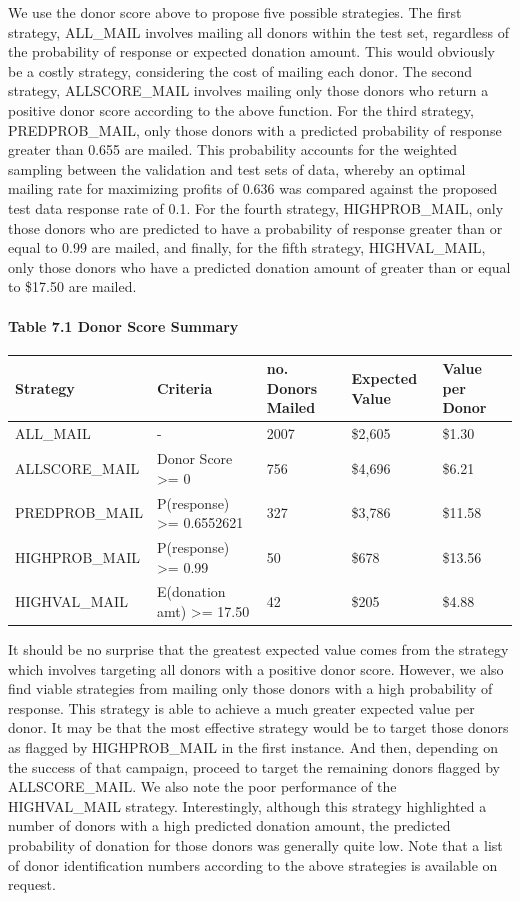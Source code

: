 \documentclass[]{article}
\let\oldparagraph\paragraph
\renewcommand{\paragraph}[1]{\oldparagraph{#1}\mbox{}}
\begin{document}
We use the donor score above to propose five possible strategies. The
first strategy, ALL\_MAIL involves mailing all donors within the test
set, regardless of the probability of response or expected donation
amount. This would obviously be a costly strategy, considering the cost
of mailing each donor. The second strategy, ALLSCORE\_MAIL involves
mailing only those donors who return a positive donor score according to
the above function. For the third strategy, PREDPROB\_MAIL, only those
donors with a predicted probability of response greater than 0.655 are
mailed. This probability accounts for the weighted sampling between the
validation and test sets of data, whereby an optimal mailing rate for
maximizing profits of 0.636 was compared against the proposed test data
response rate of 0.1. For the fourth strategy, HIGHPROB\_MAIL, only
those donors who are predicted to have a probability of response greater
than or equal to 0.99 are mailed, and finally, for the fifth strategy,
HIGHVAL\_MAIL, only those donors who have a predicted donation amount of
greater than or equal to \$17.50 are mailed.

\paragraph{Table 7.1 Donor Score
Summary}\label{table-7.1-donor-score-summary}

\begin{longtable}[]{@{}lllll@{}}
\toprule
Strategy & Criteria & no. Donors Mailed & Expected Value & Value per
Donor\tabularnewline
\midrule
\endhead
ALL\_MAIL & - & 2007 & \$2,605 & \$1.30\tabularnewline
ALLSCORE\_MAIL & Donor Score \textgreater{}= 0 & 756 & \$4,696 &
\$6.21\tabularnewline
PREDPROB\_MAIL & P(response) \textgreater{}= 0.6552621 & 327 & \$3,786 &
\$11.58\tabularnewline
HIGHPROB\_MAIL & P(response) \textgreater{}= 0.99 & 50 & \$678 &
\$13.56\tabularnewline
HIGHVAL\_MAIL & E(donation amt) \textgreater{}= 17.50 & 42 & \$205 &
\$4.88\tabularnewline
\bottomrule
\end{longtable}

It should be no surprise that the greatest expected value comes from the
strategy which involves targeting all donors with a positive donor
score. However, we also find viable strategies from mailing only those
donors with a high probability of response. This strategy is able to
achieve a much greater expected value per donor. It may be that the most
effective strategy would be to target those donors as flagged by
HIGHPROB\_MAIL in the first instance. And then, depending on the success
of that campaign, proceed to target the remaining donors flagged by
ALLSCORE\_MAIL. We also note the poor performance of the HIGHVAL\_MAIL
strategy. Interestingly, although this strategy highlighted a number of
donors with a high predicted donation amount, the predicted probability
of donation for those donors was generally quite low. Note that a list
of donor identification numbers according to the above strategies is
available on request.
\end{document}

